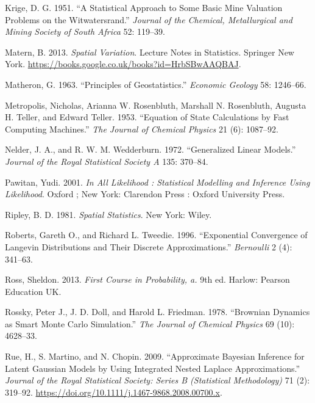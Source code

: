 \documentclass[
  letterpaper,
]{krantz}
\newlength{\cslhangindent}
\newlength{\cslentryspacingunit} %
\newenvironment{CSLReferences}[2] %
 {%
  \setlength{\parindent}{0pt}
  \ifodd #1
  \let\oldpar\par
  \def\par{\hangindent=\cslhangindent\oldpar}
  \fi
  \setlength{\parskip}{#2\cslentryspacingunit}
 }%
 {}
\begin{document}
\begin{CSLReferences}{1}{0}
\leavevmode{}%
Krige, D. G. 1951. {``A Statistical Approach to Some Basic Mine
Valuation Problems on the Witwatersrand.''} \emph{Journal of the
Chemical, Metallurgical and Mining Society of South Africa} 52: 119--39.

\leavevmode{}%
Matern, B. 2013. \emph{Spatial Variation}. Lecture Notes in Statistics.
Springer New York.
\url{https://books.google.co.uk/books?id=HrbSBwAAQBAJ}.

\leavevmode{}%
Matheron, G. 1963. {``Principles of Geostatistics.''} \emph{Economic
Geology} 58: 1246--66.

\leavevmode{}%
Metropolis, Nicholas, Arianna W. Rosenbluth, Marshall N. Rosenbluth,
Augusta H. Teller, and Edward Teller. 1953. {``Equation of State
Calculations by Fast Computing Machines.''} \emph{The Journal of
Chemical Physics} 21 (6): 1087--92.

\leavevmode{}%
Nelder, J. A., and R. W. M. Wedderburn. 1972. {``Generalized Linear
Models.''} \emph{Journal of the Royal Statistical Society A} 135:
370--84.

\leavevmode{}%
Pawitan, Yudi. 2001. \emph{In All Likelihood : Statistical Modelling and
Inference Using Likelihood}. Oxford ; New York: Clarendon Press : Oxford
University Press.

\leavevmode{}%
Ripley, B. D. 1981. \emph{Spatial Statistics}. New York: Wiley.

\leavevmode{}%
Roberts, Gareth O., and Richard L. Tweedie. 1996. {``Exponential
Convergence of Langevin Distributions and Their Discrete
Approximations.''} \emph{Bernoulli} 2 (4): 341--63.

\leavevmode{}%
Ross, Sheldon. 2013. \emph{First Course in Probability, a.} 9th ed.
Harlow: Pearson Education UK.

\leavevmode{}%
Rossky, Peter J., J. D. Doll, and Harold L. Friedman. 1978. {``Brownian
Dynamics as Smart Monte Carlo Simulation.''} \emph{The Journal of
Chemical Physics} 69 (10): 4628--33.

\leavevmode{}%
Rue, H., S. Martino, and N. Chopin. 2009. {``Approximate Bayesian
Inference for Latent Gaussian Models by Using Integrated Nested Laplace
Approximations.''} \emph{Journal of the Royal Statistical Society:
Series B (Statistical Methodology)} 71 (2): 319--92.
\url{https://doi.org/10.1111/j.1467-9868.2008.00700.x}.


\end{CSLReferences}
\end{document}
